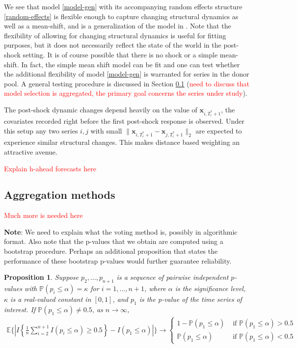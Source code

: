 \documentclass[11pt]{article}
\def\mbf#1{\mathbf{#1}} %
\def\E{\mathbb{E}} %
\def\P{\mathbb{P}}
\newtheorem{prop}{Proposition}
\theoremstyle{definition}
\begin{document}
We see that model \eqref{model-gen} with its accompanying random effects structure \eqref{random-effects} is flexible enough to capture changing structural dynamics as well as a mean-shift, and is a generalization of the model in \cite{lin2021minimizing}. Note that the flexibility of allowing for changing structural dynamics is useful for fitting purposes, but it does not necessarily reflect the state of the world in the post-shock setting. It is of course possible that there is no shock or a simple mean-shift. In fact, the simple mean shift model can be fit and one can test whether the additional flexibility of model \eqref{model-gen} is warranted for series in the donor pool. A general testing procedure is discussed in Section \ref{sec:aggmeth} (\textcolor{red}{need to discuss that model selection is aggregated, the primary goal concerns the series under study}).

The post-shock dynamic changes depend heavily on the value of $\mbf{x}_{i,T_i^*+1}$, the covariates recorded right before the first post-shock response is observed. Under this setup any two series $i,j$ with small $\|\mbf{x}_{i,T_i^*+1} - \mbf{x}_{j,T_i^*+1}\|_2$ are expected to experience similar structural changes. This makes distance based weighting an attractive avenue.

\vspace*{0.5cm}\noindent\textcolor{red}{Explain h-ahead forecasts here}



\subsection{Aggregation methods}
\label{sec:aggmeth}

\noindent\textcolor{red}{Much more is needed here}


\noindent\textbf{Note}: We need to explain what the voting method is, possibly in algorithmic format. Also note that the p-values that we obtain are computed using a bootstrap procedure. Perhaps an additional proposition that states the performance of these bootstrap p-values would further guarantee reliability. 

\begin{prop}

\label{votprop}Suppose $p_2, \ldots, p_{n+1}$ is  a sequence of pairwise independent $p$-values  with $\P(p_i \leq \alpha)=\kappa$ for $i = 1, \ldots, n+1$, where $\alpha$ is the significance level, $\kappa$ is a real-valued constant in $[0,1]$, and  $p_1$ is the p-value of the time series of interest. If $\P(p_1 \leq \alpha) \neq 0.5$,  as $n\to \infty$, 
\begin{align*}
  \E \bigg\{\left|I\left\{\frac{1}{n}\sum_{i=2}^{n+1}I(p_i \leq  \alpha) \geq 0.5\right\}
  - I( p_1 \leq  \alpha) \right|\bigg\}
  \to  \begin{cases}
    1- \P(p_1 \leq \alpha) & \text{ if } \P(p_1 \leq \alpha) > 0.5 \\
    \P(p_1 \leq \alpha) & \text{ if } \P(p_1 \leq \alpha) < 0.5 
  \end{cases}
\end{align*}
\end{prop}
\end{document}
